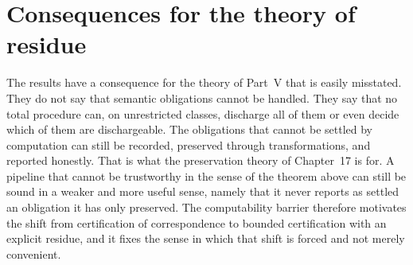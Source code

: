 \section{Consequences for the theory of residue}

The results have a consequence for the theory of Part~V that is easily misstated. They do not say that semantic obligations cannot be handled. They say that no total procedure can, on unrestricted classes, discharge all of them or even decide which of them are dischargeable. The obligations that cannot be settled by computation can still be recorded, preserved through transformations, and reported honestly. That is what the preservation theory of Chapter~17 is for. A pipeline that cannot be trustworthy in the sense of the theorem above can still be sound in a weaker and more useful sense, namely that it never reports as settled an obligation it has only preserved. The computability barrier therefore motivates the shift from certification of correspondence to bounded certification with an explicit residue, and it fixes the sense in which that shift is forced and not merely convenient.
